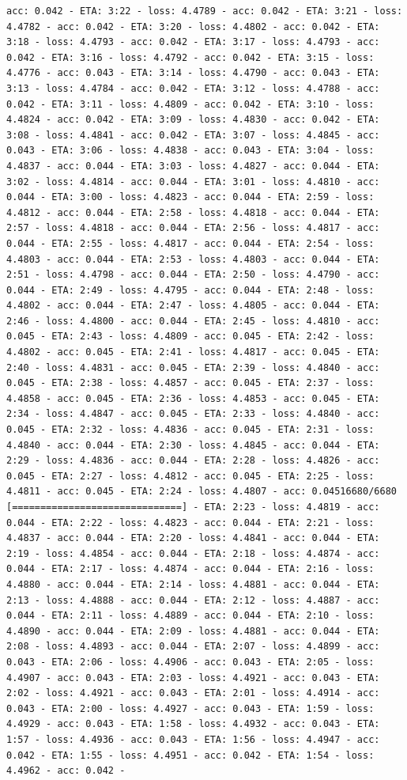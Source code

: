 \documentclass[11pt]{article}
\begin{document}
\begin{Verbatim}[commandchars=\\\{\}]
acc: 0.042 - ETA: 3:22 - loss: 4.4789 - acc: 0.042 - ETA: 3:21 - loss: 4.4782 - acc: 0.042 - ETA: 3:20 - loss: 4.4802 - acc: 0.042 - ETA: 3:18 - loss: 4.4793 - acc: 0.042 - ETA: 3:17 - loss: 4.4793 - acc: 0.042 - ETA: 3:16 - loss: 4.4792 - acc: 0.042 - ETA: 3:15 - loss: 4.4776 - acc: 0.043 - ETA: 3:14 - loss: 4.4790 - acc: 0.043 - ETA: 3:13 - loss: 4.4784 - acc: 0.042 - ETA: 3:12 - loss: 4.4788 - acc: 0.042 - ETA: 3:11 - loss: 4.4809 - acc: 0.042 - ETA: 3:10 - loss: 4.4824 - acc: 0.042 - ETA: 3:09 - loss: 4.4830 - acc: 0.042 - ETA: 3:08 - loss: 4.4841 - acc: 0.042 - ETA: 3:07 - loss: 4.4845 - acc: 0.043 - ETA: 3:06 - loss: 4.4838 - acc: 0.043 - ETA: 3:04 - loss: 4.4837 - acc: 0.044 - ETA: 3:03 - loss: 4.4827 - acc: 0.044 - ETA: 3:02 - loss: 4.4814 - acc: 0.044 - ETA: 3:01 - loss: 4.4810 - acc: 0.044 - ETA: 3:00 - loss: 4.4823 - acc: 0.044 - ETA: 2:59 - loss: 4.4812 - acc: 0.044 - ETA: 2:58 - loss: 4.4818 - acc: 0.044 - ETA: 2:57 - loss: 4.4818 - acc: 0.044 - ETA: 2:56 - loss: 4.4817 - acc: 0.044 - ETA: 2:55 - loss: 4.4817 - acc: 0.044 - ETA: 2:54 - loss: 4.4803 - acc: 0.044 - ETA: 2:53 - loss: 4.4803 - acc: 0.044 - ETA: 2:51 - loss: 4.4798 - acc: 0.044 - ETA: 2:50 - loss: 4.4790 - acc: 0.044 - ETA: 2:49 - loss: 4.4795 - acc: 0.044 - ETA: 2:48 - loss: 4.4802 - acc: 0.044 - ETA: 2:47 - loss: 4.4805 - acc: 0.044 - ETA: 2:46 - loss: 4.4800 - acc: 0.044 - ETA: 2:45 - loss: 4.4810 - acc: 0.045 - ETA: 2:43 - loss: 4.4809 - acc: 0.045 - ETA: 2:42 - loss: 4.4802 - acc: 0.045 - ETA: 2:41 - loss: 4.4817 - acc: 0.045 - ETA: 2:40 - loss: 4.4831 - acc: 0.045 - ETA: 2:39 - loss: 4.4840 - acc: 0.045 - ETA: 2:38 - loss: 4.4857 - acc: 0.045 - ETA: 2:37 - loss: 4.4858 - acc: 0.045 - ETA: 2:36 - loss: 4.4853 - acc: 0.045 - ETA: 2:34 - loss: 4.4847 - acc: 0.045 - ETA: 2:33 - loss: 4.4840 - acc: 0.045 - ETA: 2:32 - loss: 4.4836 - acc: 0.045 - ETA: 2:31 - loss: 4.4840 - acc: 0.044 - ETA: 2:30 - loss: 4.4845 - acc: 0.044 - ETA: 2:29 - loss: 4.4836 - acc: 0.044 - ETA: 2:28 - loss: 4.4826 - acc: 0.045 - ETA: 2:27 - loss: 4.4812 - acc: 0.045 - ETA: 2:25 - loss: 4.4811 - acc: 0.045 - ETA: 2:24 - loss: 4.4807 - acc: 0.04516680/6680 [==============================] - ETA: 2:23 - loss: 4.4819 - acc: 0.044 - ETA: 2:22 - loss: 4.4823 - acc: 0.044 - ETA: 2:21 - loss: 4.4837 - acc: 0.044 - ETA: 2:20 - loss: 4.4841 - acc: 0.044 - ETA: 2:19 - loss: 4.4854 - acc: 0.044 - ETA: 2:18 - loss: 4.4874 - acc: 0.044 - ETA: 2:17 - loss: 4.4874 - acc: 0.044 - ETA: 2:16 - loss: 4.4880 - acc: 0.044 - ETA: 2:14 - loss: 4.4881 - acc: 0.044 - ETA: 2:13 - loss: 4.4888 - acc: 0.044 - ETA: 2:12 - loss: 4.4887 - acc: 0.044 - ETA: 2:11 - loss: 4.4889 - acc: 0.044 - ETA: 2:10 - loss: 4.4890 - acc: 0.044 - ETA: 2:09 - loss: 4.4881 - acc: 0.044 - ETA: 2:08 - loss: 4.4893 - acc: 0.044 - ETA: 2:07 - loss: 4.4899 - acc: 0.043 - ETA: 2:06 - loss: 4.4906 - acc: 0.043 - ETA: 2:05 - loss: 4.4907 - acc: 0.043 - ETA: 2:03 - loss: 4.4921 - acc: 0.043 - ETA: 2:02 - loss: 4.4921 - acc: 0.043 - ETA: 2:01 - loss: 4.4914 - acc: 0.043 - ETA: 2:00 - loss: 4.4927 - acc: 0.043 - ETA: 1:59 - loss: 4.4929 - acc: 0.043 - ETA: 1:58 - loss: 4.4932 - acc: 0.043 - ETA: 1:57 - loss: 4.4936 - acc: 0.043 - ETA: 1:56 - loss: 4.4947 - acc: 0.042 - ETA: 1:55 - loss: 4.4951 - acc: 0.042 - ETA: 1:54 - loss: 4.4962 - acc: 0.042 - 
\end{Verbatim}
\end{document}
